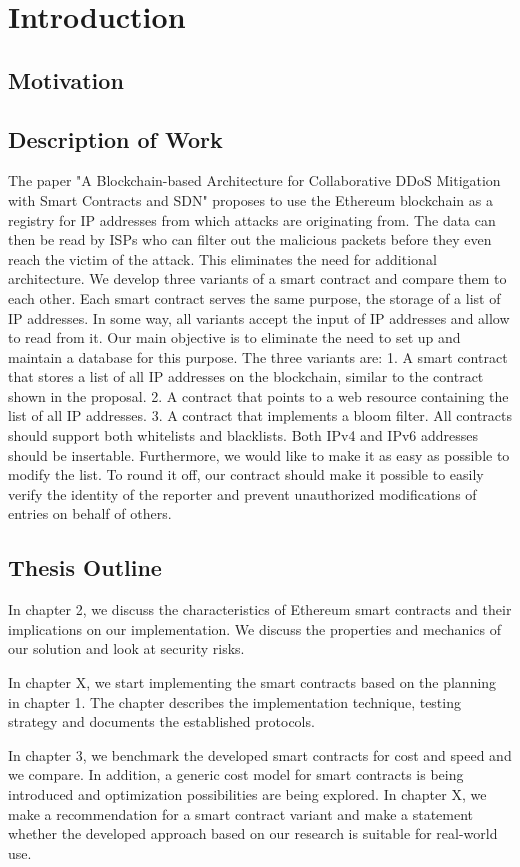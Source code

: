 \chapter{Introduction}

\section{Motivation}


\section{Description of Work}

The paper {"}A Blockchain-based Architecture for Collaborative DDoS Mitigation with Smart Contracts and SDN{"} proposes to use the Ethereum blockchain as a registry for IP addresses from which attacks are originating from. The data can then be read by ISPs who can filter out the malicious packets before they even reach the victim of the attack. This eliminates the need for additional architecture.
We develop three variants of a smart contract and compare them to each other. Each smart contract serves the same purpose, the storage of a list of IP addresses. In some way, all variants accept the input of IP addresses and allow to read from it.
Our main objective is to eliminate the need to set up and maintain a database for this purpose.
The three variants are: 1. A smart contract that stores a list of all IP addresses on the blockchain, similar to the contract shown in the proposal. 2. A contract that points to a web resource containing the list of all IP addresses. 3. A contract that implements a bloom filter.
All contracts should support both whitelists and blacklists. Both IPv4 and IPv6 addresses should be insertable. Furthermore, we would like to make it as easy as possible to modify the list. To round it off, our contract should make it possible to easily verify the identity of the reporter and prevent unauthorized modifications of entries on behalf of others. 

\section{Thesis Outline}

In chapter 2, we discuss the characteristics of Ethereum smart contracts and their implications on our implementation. We discuss the properties and mechanics of our solution and look at security risks.

In chapter X, we start implementing the smart contracts based on the planning in chapter 1. The chapter describes the implementation technique, testing strategy and documents the established protocols.

In chapter 3, we benchmark the developed smart contracts for cost and speed and we compare. In addition, a generic cost model for smart contracts is being introduced and optimization possibilities are being explored.
In chapter X, we make a recommendation for a smart contract variant and make a statement whether the developed approach based on our research is suitable for real-world use.

